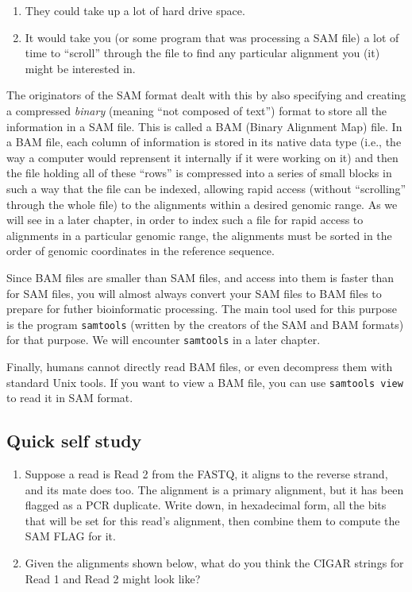 \documentclass[]{krantz}
\providecommand{\tightlist}{%
  \setlength{\itemsep}{0pt}\setlength{\parskip}{0pt}}
\begin{document}
\begin{enumerate}
\def\labelenumi{\arabic{enumi}.}
\tightlist
\item
  They could take up a lot of hard drive space.
\item
  It would take you (or some program that was processing a SAM file)
  a lot of time to ``scroll'' through the file to find any particular alignment you (it)
  might be interested in.
\end{enumerate}

The originators of the SAM format dealt with this by also specifying and creating
a compressed \emph{binary} (meaning ``not composed of text'') format to store all the
information in a SAM file. This is called a BAM (Binary Alignment Map) file. In a
BAM file, each column of information is stored in its native data type (i.e., the way a
computer would reprensent it internally if it were working on it) and then the file holding all
of these ``rows'' is compressed into a series of small blocks in such a way that the file can be
indexed, allowing rapid
access (without ``scrolling'' through the whole file) to the alignments within
a desired genomic range. As we will see in a later chapter,
in order to index such a file for rapid
access to alignments in a particular genomic range, the alignments must be sorted
in the order of genomic coordinates in the reference sequence.

Since BAM files are smaller than SAM files, and access into them
is faster than for SAM files, you will almost always convert your SAM files to BAM
files to prepare for futher bioinformatic processing. The main tool
used for this purpose is the program \texttt{samtools}
(written by the creators of the SAM and BAM formats)
for that purpose. We will encounter \texttt{samtools} in a later chapter.

Finally, humans cannot directly read BAM files, or even decompress them with
standard Unix tools. If you want to view a BAM file, you can use
\texttt{samtools\ view} to read it in SAM format.

\hypertarget{quick-self-study}{%
\subsection{Quick self study}\label{quick-self-study}}

\begin{enumerate}
\def\labelenumi{\arabic{enumi}.}
\tightlist
\item
  Suppose a read is Read 2 from the FASTQ, it aligns to the reverse strand, and its mate does
  too. The alignment is a primary alignment, but it has been flagged as a PCR duplicate. Write
  down, in hexadecimal form, all the bits that will be set for this read's alignment, then
  combine them to compute the SAM FLAG for it.
\item
  Given the alignments shown below, what do you think the CIGAR strings for Read 1 and Read 2
  might look like?
\end{enumerate}
\end{document}
